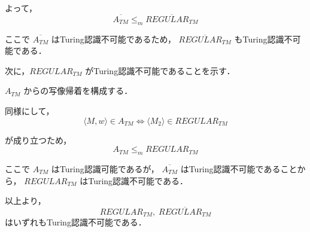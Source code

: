 \documentclass[a4paper,11pt]{ltjsarticle}
\begin{document}
よって，
\[
\overline{A_{TM}} \leq_m \overline{REGULAR_{TM}}
\]

ここで $\overline{A_{TM}}$ はTuring認識不可能であるため，
$\overline{REGULAR_{TM}}$ もTuring認識不可能である．

\vspace{1em}

次に，$REGULAR_{TM}$ がTuring認識不可能であることを示す．

$A_{TM}$ からの写像帰着を構成する．

同様にして，
\[
\langle M,w\rangle \in A_{TM}
\iff
\langle M_2 \rangle \in REGULAR_{TM}
\]

が成り立つため，
\[
A_{TM} \leq_m REGULAR_{TM}
\]

ここで $A_{TM}$ はTuring認識可能であるが，
$\overline{A_{TM}}$ はTuring認識不可能であることから，
$REGULAR_{TM}$ はTuring認識不可能である．

\vspace{1em}

以上より，
\[
REGULAR_{TM},\; \overline{REGULAR_{TM}}
\]
はいずれもTuring認識不可能である．
\end{document}
